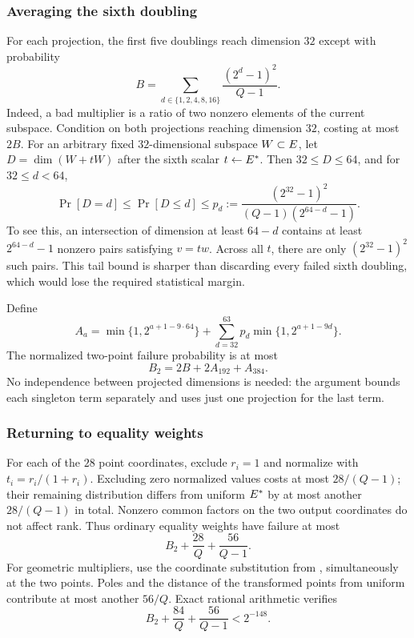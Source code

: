 \subsubsection{Averaging the sixth doubling}

For each projection, the first five doublings reach dimension $32$ except with probability
\[
 B=\sum_{d\in\{1,2,4,8,16\}}\frac{(2^d-1)^2}{Q-1}.
\]
Indeed, a bad multiplier is a ratio of two nonzero elements of the current subspace. Condition on both projections reaching dimension $32$, costing at most $2B$. For an arbitrary fixed $32$-dimensional subspace $W\subset E$, let $D=\dim(W+tW)$ after the sixth scalar $t\gets E^*$. Then $32\le D\le64$, and for $32\le d<64$,
\begin{equation}\label{eq:two-dimension-tail}
 \Pr[D=d]\le\Pr[D\le d]
 \le p_d:=\frac{(2^{32}-1)^2}{(Q-1)(2^{64-d}-1)}.
\end{equation}
To see this, an intersection of dimension at least $64-d$ contains at least $2^{64-d}-1$ nonzero pairs satisfying $v=tw$. Across all $t$, there are only $(2^{32}-1)^2$ such pairs. This tail bound is sharper than discarding every failed sixth doubling, which would lose the required statistical margin.

Define
\[
 A_a=\min\{1,2^{a+1-9\cdot64}\}
 +\sum_{d=32}^{63}p_d\min\{1,2^{a+1-9d}\}.
\]
The normalized two-point failure probability is at most
\[
 B_2=2B+2A_{192}+A_{384}.
\]
No independence between projected dimensions is needed: the argument bounds each singleton term separately and uses just one projection for the last term.

\subsubsection{Returning to equality weights}

For each of the $28$ point coordinates, exclude $r_i=1$ and normalize with $t_i=r_i/(1+r_i)$. Excluding zero normalized values costs at most $28/(Q-1)$; their remaining distribution differs from uniform $E^*$ by at most another $28/(Q-1)$ in total. Nonzero common factors on the two output coordinates do not affect rank. Thus ordinary equality weights have failure at most
\[
 B_2+\frac{28}{Q}+\frac{56}{Q-1}.
\]
For geometric multipliers, use the coordinate substitution from , simultaneously at the two points. Poles and the distance of the transformed points from uniform contribute at most another $56/Q$. Exact rational arithmetic verifies
\[
 B_2+\frac{84}{Q}+\frac{56}{Q-1}<2^{-148}.
\]

